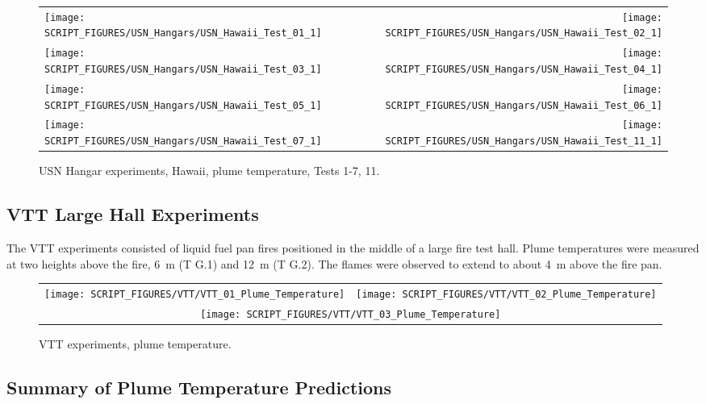 \begin{figure}[p]
\begin{tabular*}{\textwidth}{l@{\extracolsep{\fill}}r}
\texttt{[image: SCRIPT\_FIGURES/USN\_Hangars/USN\_Hawaii\_Test\_01\_1]} &
\texttt{[image: SCRIPT\_FIGURES/USN\_Hangars/USN\_Hawaii\_Test\_02\_1]} \\
\texttt{[image: SCRIPT\_FIGURES/USN\_Hangars/USN\_Hawaii\_Test\_03\_1]} &
\texttt{[image: SCRIPT\_FIGURES/USN\_Hangars/USN\_Hawaii\_Test\_04\_1]} \\
\texttt{[image: SCRIPT\_FIGURES/USN\_Hangars/USN\_Hawaii\_Test\_05\_1]} &
\texttt{[image: SCRIPT\_FIGURES/USN\_Hangars/USN\_Hawaii\_Test\_06\_1]} \\
\texttt{[image: SCRIPT\_FIGURES/USN\_Hangars/USN\_Hawaii\_Test\_07\_1]} &
\texttt{[image: SCRIPT\_FIGURES/USN\_Hangars/USN\_Hawaii\_Test\_11\_1]}
\end{tabular*}
\caption[USN Hangar experiments, Hawaii, plume temperature, Tests 1-7, 11]
{USN Hangar experiments, Hawaii, plume temperature, Tests 1-7, 11.}
\label{USN_Plume_Hawaii}
\end{figure}

\clearpage

\subsection{VTT Large Hall Experiments}

\label{VTT_plume}

The VTT experiments consisted of liquid fuel pan fires positioned in the middle of a large fire test hall. Plume temperatures were measured at two heights above the fire, 6~m (T G.1) and 12~m (T G.2). The flames were observed to extend to about 4~m above the fire pan.


\begin{figure}[!h]
\begin{tabular*}{\textwidth}{l@{\extracolsep{\fill}}r}
\texttt{[image: SCRIPT\_FIGURES/VTT/VTT\_01\_Plume\_Temperature]} &
\texttt{[image: SCRIPT\_FIGURES/VTT/VTT\_02\_Plume\_Temperature]} \\
\multicolumn{2}{c}{\texttt{[image: SCRIPT\_FIGURES/VTT/VTT\_03\_Plume\_Temperature]}}
\end{tabular*}
\caption[VTT experiments, plume temperature]
{VTT experiments, plume temperature.}
\label{VTT_Plume}
\end{figure}


\clearpage


\subsection{Summary of Plume Temperature Predictions}
\label{Plume Temperature}



